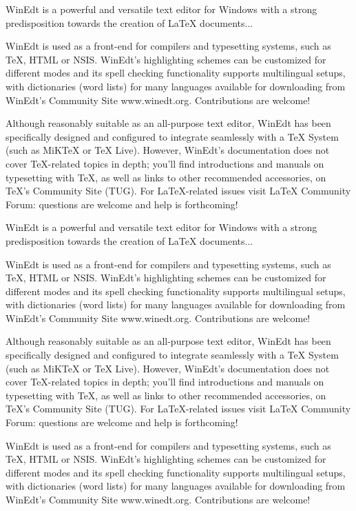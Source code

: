 \documentclass[12pt,a4paper]{article}
\let\footnote=\endnote
\begin{document}
WinEdt is a powerful and versatile text editor for Windows with a strong predisposition towards the creation of LaTeX documents...

WinEdt is used as a front-end for compilers\footnote{A software that compiles!} and typesetting systems, such as TeX, HTML or NSIS. WinEdt's highlighting schemes can be customized for different modes and its spell checking functionality supports multilingual setups, with dictionaries (word lists) for many languages available for downloading from WinEdt's Community Site www.winedt.org. Contributions are welcome!

Although reasonably suitable as an all-purpose text editor, WinEdt has been specifically designed and configured to integrate seamlessly with a TeX System (such as MiKTeX or TeX Live). However, WinEdt's documentation does not cover TeX-related topics in depth; you'll find introductions and manuals on typesetting with TeX, as well as links to other recommended accessories, on TeX's Community Site (TUG). For LaTeX-related issues visit LaTeX Community Forum: questions are welcome and help is forthcoming!

WinEdt is a powerful and versatile text editor for Windows with a strong predisposition towards the creation of LaTeX documents...

WinEdt is used as a front-end for compilers and typesetting systems, such as TeX, HTML or NSIS. WinEdt's highlighting schemes can be customized for different modes and its spell checking functionality supports multilingual setups, with dictionaries (word lists) for many languages available for downloading from WinEdt's Community Site www.winedt.org\footnote{This is a URL}. Contributions are welcome!

Although reasonably suitable as an all-purpose text editor, WinEdt has been specifically designed and configured to integrate seamlessly with a TeX System (such as MiKTeX or TeX Live). However, WinEdt's documentation does not cover TeX-related topics in depth; you'll find introductions and manuals on typesetting with TeX, as well as links to other recommended accessories, on TeX's Community Site (TUG). For LaTeX-related issues visit LaTeX Community Forum: questions are welcome and help is forthcoming!

WinEdt is used as a front-end for compilers and typesetting systems, such as TeX, HTML or NSIS. WinEdt's highlighting schemes can be customized for different modes and its spell checking functionality supports multilingual setups, with dictionaries (word lists) for many languages available for downloading from WinEdt's Community Site www.winedt.org\footnote{This is a URL}. Contributions are welcome!
\end{document}
